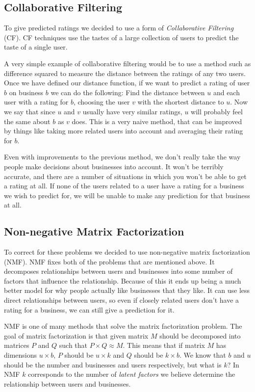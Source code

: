 \subsection{Collaborative Filtering}
To give predicted ratings we decided to use a form of \emph{Collaborative
Filtering} (CF). CF techniques use the tastes of a large collection of users to
predict the taste of a single user.

A very simple example of collaborative filtering would be to use a method such
as difference squared to measure the distance between the ratings of any two
users. Once we have defined our distance function, if we want to predict a
rating of user $b$ on business $b$ we can do the following: Find the distance
between $u$ and each user with a rating for $b$, choosing the user $v$ with the
shortest distance to $u$. Now we say that since $u$ and $v$ usually have very
similar ratings, $u$ will probably feel the same about $b$ as $v$ does. This is
a very naive method, that can be improved by things like taking more related
users into account and averaging their rating for $b$.

Even with improvements to the previous method, we don't really take the way
people make decisions about businesses into account. It won't be terribly
accurate, and there are a number of situations in which you won't be able to get
a rating at all. If none of the users related to a user have a rating for a
business we wish to predict for, we will be unable to make any prediction for
that business at all. 

\subsection{Non-negative Matrix Factorization}
To correct for these problems we decided to use non-negative matrix
factorization (NMF). NMF fixes both of the problems that are mentioned above. It
decomposes relationships between users and businesses into some number of
factors that influence the relationship. Because of this it ends up being a much
better model for why people actually like businesses that they like. It can use
less direct relationships between users, so even if closely related users don't
have a rating for a business, we can still give a prediction for it. 

NMF is one of many methods that solve the matrix factorization problem. The goal
of matrix factorization is that given matrix $M$ should be decomposed into
matrices $P$ and $Q$ such that $P \times Q \approx M $. This means that if
matrix $M$ has dimensions $u \times b$, $P$ should be $u \times k$ and $Q$
should be $k \times b$. We know that $b$ and $u$ should be the number and
businesses and users respectively, but what is $k$? In NMF $k$ corresponds to
the number of \emph{latent factors} we believe determine the relationship
between users and businesses.

